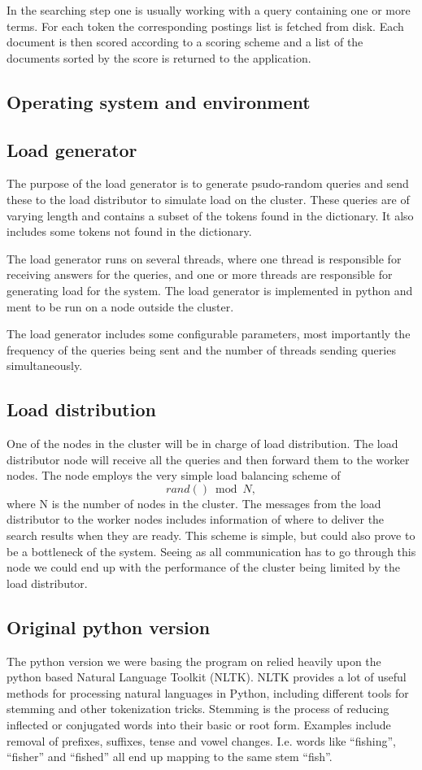 In the searching step one is usually working with a query containing one or more terms. For each token the corresponding postings list is fetched from disk. Each document is then scored according to a scoring scheme and a list of the documents sorted by the score is returned to the application.\cite{IntroIR}


\subsection{Operating system and environment}
\subsection{Load generator}
The purpose of the load generator is to generate psudo-random queries and send these to the load distributor to simulate load on the cluster. These queries are of varying length and contains a subset of the tokens found in the dictionary. It also includes some tokens not found in the dictionary.

The load generator runs on several threads, where one thread is responsible for receiving answers for the queries, and one or more threads are responsible for generating load for the system. The load generator is implemented in python and ment to be run on a node outside the cluster.

The load generator includes some configurable parameters, most importantly the frequency of the queries being sent and the number of threads sending queries simultaneously.

\subsection{Load distribution}
One of the nodes in the cluster will be in charge of load distribution. The load distributor node will receive all the queries and then forward them to the worker nodes.
The node employs the very simple load balancing scheme of $$rand() \bmod N,$$ where N is the number of nodes in the cluster.
The messages from the load distributor to the worker nodes includes information of where to deliver the search results when they are ready.
This scheme is simple, but could also prove to be a bottleneck of the system. Seeing as all communication has to go through this node we could end up with the performance of the cluster being limited by the load distributor.

\subsection{Original python version}
The python version we were basing the program on relied heavily upon the python based Natural Language Toolkit\cite{nltk} (NLTK).
NLTK provides a lot of useful methods for processing natural languages in Python, including different tools for stemming and other tokenization tricks.
Stemming is the process of reducing inflected or conjugated words into their basic or root form. Examples include removal of prefixes, suffixes, tense and vowel changes. I.e. words like ``fishing'', ``fisher'' and ``fished'' all end up mapping to the same stem ``fish''.

